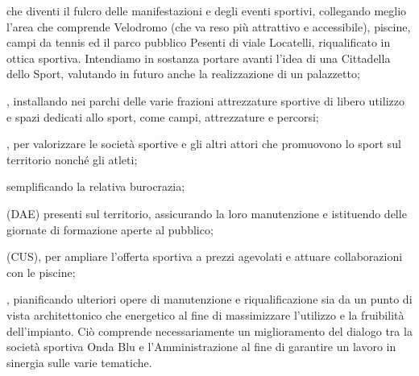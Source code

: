  che diventi il fulcro delle manifestazioni e degli eventi sportivi, collegando meglio l'area che comprende Velodromo (che va reso più attrattivo e accessibile), piscine, campi da tennis ed il parco pubblico Pesenti di viale Locatelli, riqualificato in ottica sportiva. Intendiamo in sostanza portare avanti l'idea di una Cittadella dello Sport, valutando in futuro anche la realizzazione di un palazzetto;

, installando nei parchi delle varie frazioni attrezzature sportive di libero utilizzo e spazi dedicati allo sport, come campi, attrezzature e percorsi;

, per valorizzare le società sportive e gli altri attori che promuovono lo sport sul territorio nonché gli atleti;

 semplificando la relativa burocrazia;

 (DAE) presenti sul territorio, assicurando la loro manutenzione e istituendo delle giornate di formazione aperte al pubblico;

 (CUS), per ampliare l'offerta sportiva a prezzi agevolati e attuare collaborazioni con le piscine;

, pianificando ulteriori opere di manutenzione e riqualificazione sia da un punto di vista architettonico che energetico al fine di massimizzare l'utilizzo e la fruibilità dell'impianto. Ciò comprende necessariamente un miglioramento del dialogo tra la società sportiva Onda Blu e l'Amministrazione al fine di garantire un lavoro in sinergia sulle varie tematiche.
